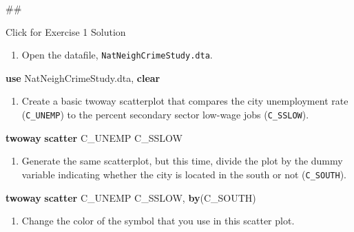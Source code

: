\documentclass[
]{book}
\newenvironment{Shaded}{\begin{snugshade}}{\end{snugshade}}
\newcommand{\KeywordTok}[1]{\textcolor[rgb]{0.13,0.29,0.53}{\textbf{#1}}}
\newcommand{\NormalTok}[1]{#1}
\providecommand{\tightlist}{%
  \setlength{\itemsep}{0pt}\setlength{\parskip}{0pt}}
\begin{document}
\begin{Shaded}
\begin{Highlighting}[]
\NormalTok{\#\#}
\end{Highlighting}
\end{Shaded}

{Click for Exercise 1 Solution}

\begin{enumerate}
\def\labelenumi{\arabic{enumi}.}
\tightlist
\item
  Open the datafile, \texttt{NatNeighCrimeStudy.dta}.
\end{enumerate}

\begin{Shaded}
\begin{Highlighting}[]
\KeywordTok{use}\NormalTok{ NatNeighCrimeStudy.dta, }\KeywordTok{clear}
\end{Highlighting}
\end{Shaded}

\begin{enumerate}
\def\labelenumi{\arabic{enumi}.}
\setcounter{enumi}{1}
\tightlist
\item
  Create a basic twoway scatterplot that compares the city unemployment rate (\texttt{C\_UNEMP}) to the percent secondary sector low-wage jobs (\texttt{C\_SSLOW}).
\end{enumerate}

\begin{Shaded}
\begin{Highlighting}[]
\KeywordTok{twoway} \KeywordTok{scatter}\NormalTok{ C\_UNEMP C\_SSLOW}
\end{Highlighting}
\end{Shaded}

\begin{enumerate}
\def\labelenumi{\arabic{enumi}.}
\setcounter{enumi}{2}
\tightlist
\item
  Generate the same scatterplot, but this time, divide the plot by the dummy variable indicating whether the city is located in the south or not (\texttt{C\_SOUTH}).
\end{enumerate}

\begin{Shaded}
\begin{Highlighting}[]
\KeywordTok{twoway} \KeywordTok{scatter}\NormalTok{ C\_UNEMP C\_SSLOW, }\KeywordTok{by}\NormalTok{(C\_SOUTH)}
\end{Highlighting}
\end{Shaded}

\begin{enumerate}
\def\labelenumi{\arabic{enumi}.}
\setcounter{enumi}{3}
\tightlist
\item
  Change the color of the symbol that you use in this scatter plot.
\end{enumerate}
\end{document}
